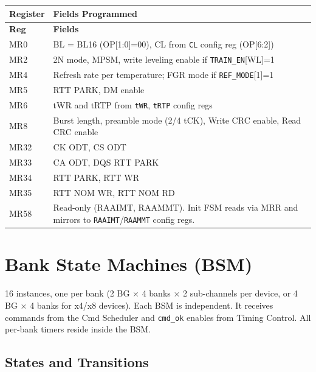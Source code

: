 \documentclass[11pt,a4paper]{article}
\newcommand{\reg}[1]{\textcolor{ddrpurple}{\texttt{#1}}}
\newcommand{\sig}[1]{\textcolor{ddrteal}{\texttt{#1}}}
\begin{document}
\begin{longtable}{L{1.8cm} L{12.7cm}}
\toprule
\textbf{Register} & \textbf{Fields Programmed} \\
\midrule
\endfirsthead\toprule\textbf{Reg}&\textbf{Fields}\\\midrule\endhead\bottomrule\endfoot
{}
MR0  & BL = BL16 (OP[1:0]=00), CL from \reg{CL} config reg (OP[6:2]) \\
MR2  & 2N mode, MPSM, write leveling enable if \reg{TRAIN\_EN}[WL]=1 \\
MR4  & Refresh rate per temperature; FGR mode if \reg{REF\_MODE}[1]=1 \\
MR5  & RTT PARK, DM enable \\
MR6  & tWR and tRTP from \reg{tWR}, \reg{tRTP} config regs \\
MR8  & Burst length, preamble mode (2/4 tCK), Write CRC enable, Read CRC enable \\
MR32 & CK ODT, CS ODT \\
MR33 & CA ODT, DQS RTT PARK \\
MR34 & RTT PARK, RTT WR \\
MR35 & RTT NOM WR, RTT NOM RD \\
MR58 & Read-only (RAAIMT, RAAMMT). Init FSM reads via MRR and mirrors to \reg{RAAIMT}/\reg{RAAMMT} config regs. \\
\end{longtable}

\section{Bank State Machines (BSM)}

\begin{notebox}
16 instances, one per bank (2 BG $\times$ 4 banks $\times$ 2 sub-channels per device, or
4 BG $\times$ 4 banks for x4/x8 devices). Each BSM is independent. It receives commands
from the Cmd Scheduler and \sig{cmd\_ok} enables from Timing Control. All per-bank
timers reside inside the BSM.
\end{notebox}

\subsection{States and Transitions}
\end{document}

